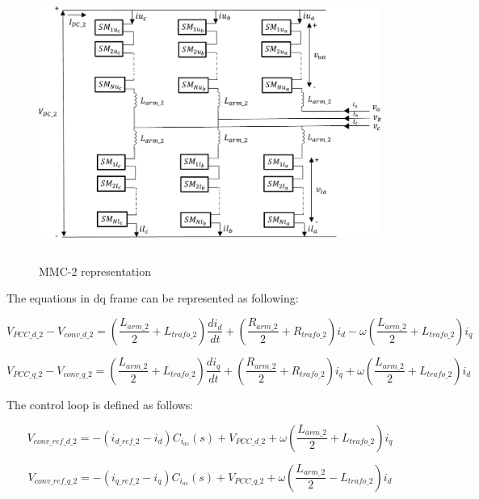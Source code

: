 \begin{figure}[H]
\centering
    \includegraphics[height = 9cm,width = 13.5cm]{Diagrams/Chapter_4/MMC_pow_system_2.pdf}
    \caption{MMC-2 representation \cite{saad2015modelisation}}
    \label{fig:MMC_pow_system_2}
\end{figure}

The equations in dq frame can be represented as following:

\begin{equation}
    V_{PCC\_d\_2} - V_{conv\_d\_2} = \left(\frac{L_{arm\_2}}{2} + L_{trafo\_2}\right)\frac{di_{d}}{dt} +\left (\frac{R_{arm\_2}}{2}+R_{trafo\_2}\right)i_d-\omega\left(\frac{L_{arm\_2}}{2}+L_{trafo\_2}\right)i_q
\end{equation}

\begin{equation}
    V_{PCC\_q\_2} - V_{conv\_q\_2} = \left(\frac{L_{arm\_2}}{2} + L_{trafo\_2}\right)\frac{di_{q}}{dt} +\left (\frac{R_{arm\_2}}{2}+R_{trafo\_2}\right)i_q+\omega\left(\frac{L_{arm\_2}}{2}+L_{trafo\_2}\right)i_d
\end{equation}

The control loop is defined as follows:

\begin{equation}
    V_{conv\_ref\_d\_2} = - \left(i_{d\_ref\_2} - i_d\right)C_{i_{ac}}\left(s\right) + V_{PCC\_d\_2} + \omega\left(\frac{L_{arm\_2}}{2}+L_{trafo\_2}\right)i_q
\end{equation}

\begin{equation}
    V_{conv\_ref\_q\_2} = - \left(i_{q\_ref\_2} - i_q\right)C_{i_{ac}}\left(s\right) + V_{PCC\_q\_2} + \omega\left(\frac{L_{arm\_2}}{2}-L_{trafo\_2}\right)i_d
\end{equation}

